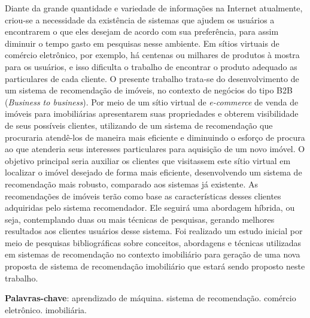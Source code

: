\begin{resumo}

Diante da grande quantidade e variedade de informações na Internet atualmente, criou-se a necessidade da existência de sistemas que ajudem os usuários a encontrarem o que eles desejam de acordo com sua preferência, para assim diminuir o tempo gasto em pesquisas nesse ambiente. Em sítios virtuais de comércio eletrônico, por exemplo, há centenas ou milhares de produtos à mostra para os usuários, e isso dificulta o trabalho de encontrar o produto adequado as particulares de cada cliente. O presente trabalho trata-se do desenvolvimento de um sistema de recomendação de imóveis, no contexto de negócios do tipo B2B (\textit{Business to business}). Por meio de um sítio virtual de \textit{e-commerce} de venda de imóveis para imobiliárias apresentarem suas propriedades e obterem visibilidade de seus possíveis clientes, utilizando de um sistema de recomendação que procuraria atendê-los de maneira mais eficiente e diminuindo o esforço de procura ao que atenderia seus interesses particulares para aquisição de um novo imóvel. O objetivo principal seria auxiliar os clientes que visitassem este sítio virtual em localizar o imóvel desejado de forma mais eficiente, desenvolvendo um sistema de recomendação mais robusto, comparado aos sistemas já existente. As recomendações de imóveis terão como base as características desses clientes adquiridas pelo sistema recomendador. Ele seguirá uma abordagem híbrida, ou seja, contemplando duas ou mais técnicas de pesquisas, gerando melhores resultados aos clientes usuários desse sistema. Foi realizado um estudo inicial por meio de pesquisas bibliográficas sobre conceitos, abordagens e técnicas utilizadas em sistemas de recomendação no contexto imobiliário para geração de uma nova proposta de sistema de recomendação imobiliário que estará sendo proposto neste trabalho.

 \vspace{\onelineskip}
    
 \noindent
 \textbf{Palavras-chave}: aprendizado de máquina. sistema de recomendação. comércio eletrônico. imobiliária.
\end{resumo}
